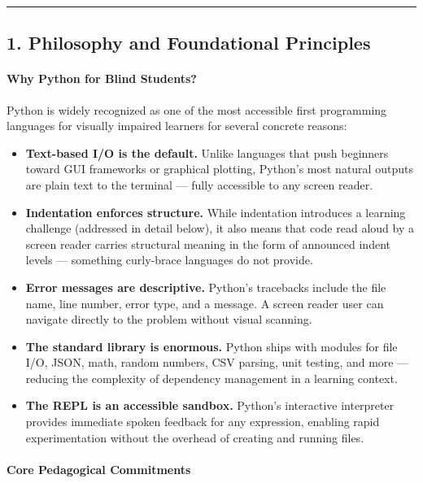 \documentclass[
  justified,
  openright,
]{tufte-book}
\let\subsubsection\paragraph
\let\paragraph\paragraph
\let\subsubsection\paragraph
\let\paragraph\paragraph
\providecommand{\tightlist}{%
  \setlength{\itemsep}{0pt}\setlength{\parskip}{0pt}}
\begin{document}
\begin{center}\rule{0.5\linewidth}{0.5pt}\end{center}

\subsection{1. Philosophy and Foundational
Principles}\label{philosophy-and-foundational-principles}

\subsubsection{Why Python for Blind
Students?}\label{why-python-for-blind-students}

Python is widely recognized as one of the most accessible first
programming languages for visually impaired learners for several
concrete reasons:

\begin{itemize}
\tightlist
\item
  \textbf{Text-based I/O is the default.} Unlike languages that push
  beginners toward GUI frameworks or graphical plotting, Python's most
  natural outputs are plain text to the terminal --- fully accessible to
  any screen reader.
\item
  \textbf{Indentation enforces structure.} While indentation introduces
  a learning challenge (addressed in detail below), it also means that
  code read aloud by a screen reader carries structural meaning in the
  form of announced indent levels --- something curly-brace languages do
  not provide.
\item
  \textbf{Error messages are descriptive.} Python's tracebacks include
  the file name, line number, error type, and a message. A screen reader
  user can navigate directly to the problem without visual scanning.
\item
  \textbf{The standard library is enormous.} Python ships with modules
  for file I/O, JSON, math, random numbers, CSV parsing, unit testing,
  and more --- reducing the complexity of dependency management in a
  learning context.
\item
  \textbf{The REPL is an accessible sandbox.} Python's interactive
  interpreter provides immediate spoken feedback for any expression,
  enabling rapid experimentation without the overhead of creating and
  running files.
\end{itemize}

\subsubsection{Core Pedagogical
Commitments}\label{core-pedagogical-commitments}
\end{document}
